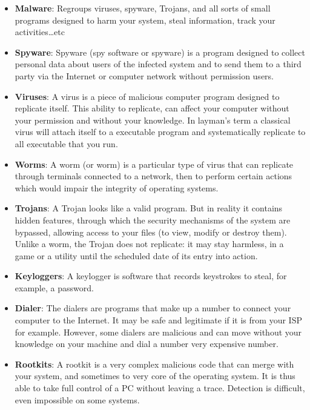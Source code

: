 \documentclass [12pt, a4paper]{article}
\begin{document}
\begin{itemize}
	\item \textbf{Malware}: Regroups viruses, spyware, Trojans, and all sorts of small programs designed to harm your system, steal information, track your activities…etc
	\item \textbf{Spyware}: Spyware (spy software or spyware) is a program designed to collect personal data about users of the infected system and to send them to a third party via the Internet or computer network without permission users.
	\item \textbf{Viruses}: A virus is a piece of malicious computer program designed to replicate itself. This ability to replicate, can affect your computer without your permission and without your knowledge. In layman’s term a classical virus will attach itself to a executable program and systematically replicate to all executable that you run.
	\item \textbf{Worms}: A worm (or worm) is a particular type of virus that can replicate through terminals connected to a network, then to perform certain actions which would impair the integrity of operating systems. 
	\item \textbf{Trojans}: A Trojan looks like a valid program. But in reality it contains hidden features, through which the security mechanisms of the system are bypassed, allowing access to your files (to view, modify or destroy them). Unlike a worm, the Trojan does not replicate: it may stay harmless, in a game or a utility until the scheduled date of its entry into action.
	\item \textbf{Keyloggers}: A keylogger is software that records keystrokes to steal, for example, a password. 
	\item \textbf{Dialer}: The dialers are programs that make up a number to connect your computer to the Internet. It may be safe and legitimate if it is from your ISP for example. However, some dialers are malicious and can move without your knowledge on your machine and dial a number very expensive number.
	\item \textbf{Rootkits}: A rootkit is a very complex malicious code that can merge with your system, and sometimes to very core of the operating system. It is thus able to take full control of a PC without leaving a trace. Detection is difficult, even impossible on some systems.

\end{itemize}
\end{document}
